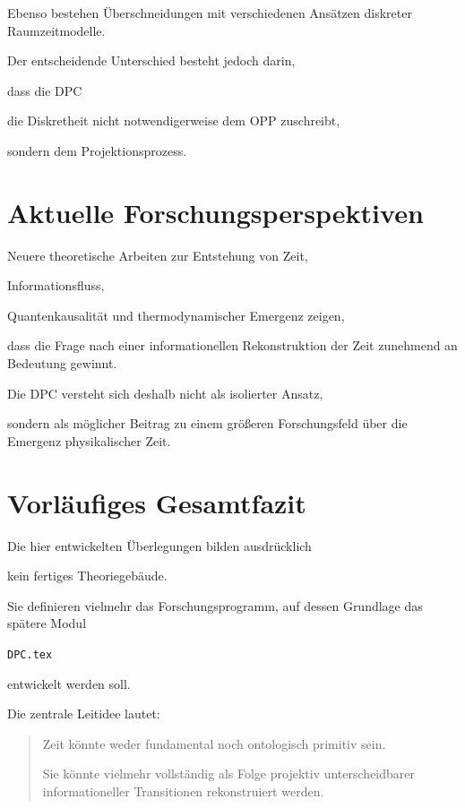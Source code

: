 \documentclass[11pt,a4paper]{article}
\begin{document}
Ebenso bestehen Überschneidungen
mit verschiedenen Ansätzen
diskreter Raumzeitmodelle.

Der entscheidende Unterschied besteht jedoch darin,

dass die DPC

die Diskretheit nicht notwendigerweise
dem OPP zuschreibt,

sondern dem Projektionsprozess.

\section{Aktuelle Forschungsperspektiven}

Neuere theoretische Arbeiten zur Entstehung
von Zeit,

Informationsfluss,

Quantenkausalität
und thermodynamischer Emergenz
zeigen,

dass die Frage nach einer
informationellen Rekonstruktion
der Zeit zunehmend an Bedeutung gewinnt.

Die DPC versteht sich deshalb
nicht als isolierter Ansatz,

sondern als möglicher Beitrag
zu einem größeren Forschungsfeld
über die Emergenz physikalischer Zeit.

\section{Vorläufiges Gesamtfazit}

Die hier entwickelten Überlegungen
bilden ausdrücklich

kein fertiges Theoriegebäude.

Sie definieren vielmehr
das Forschungsprogramm,
auf dessen Grundlage
das spätere Modul

\texttt{DPC.tex}

entwickelt werden soll.

Die zentrale Leitidee lautet:

\begin{quote}

Zeit könnte weder fundamental
noch ontologisch primitiv sein.

Sie könnte vielmehr vollständig
als Folge projektiv unterscheidbarer
informationeller Transitionen
rekonstruiert werden.

\end{quote}
\end{document}

